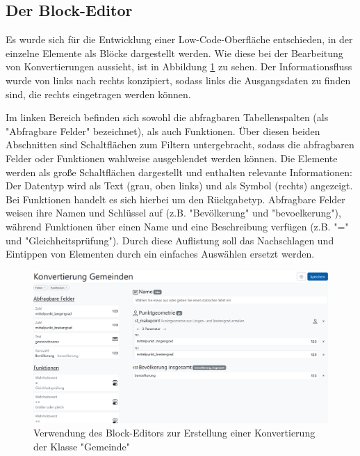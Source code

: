 \subsection{Der Block-Editor}

Es wurde sich für die Entwicklung einer Low-Code-Oberfläche entschieden, in der einzelne Elemente als Blöcke dargestellt werden. Wie diese bei der Bearbeitung von Konvertierungen aussieht, ist in Abbildung \ref{fig:buffet-simple} zu sehen. Der Informationsfluss wurde von links nach rechts konzipiert, sodass links die Ausgangsdaten zu finden sind, die rechts eingetragen werden können.

Im linken Bereich befinden sich sowohl die abfragbaren Tabellenspalten (als "Abfragbare Felder" bezeichnet), als auch Funktionen. Über diesen beiden Abschnitten sind Schaltflächen zum Filtern untergebracht, sodass die abfragbaren Felder oder Funktionen wahlweise ausgeblendet werden können. Die Elemente werden als große Schaltflächen dargestellt und enthalten relevante Informationen: Der Datentyp wird als Text (grau, oben links) und als Symbol (rechts) angezeigt. Bei Funktionen handelt es sich hierbei um den Rückgabetyp. Abfragbare Felder weisen ihre Namen und Schlüssel auf (z.B. "Bevölkerung" und "bevoelkerung"), während Funktionen über einen Name und eine Beschreibung verfügen (z.B. "=" und "Gleichheitsprüfung"). Durch diese Auflistung soll das Nachschlagen und Eintippen von Elementen durch ein einfaches Auswählen ersetzt werden.

\begin{figure}[ht]
  \centering
  \includegraphics[width=.95\textwidth]{assets/buffet-simple.png}
  \caption{Verwendung des Block-Editors zur Erstellung einer Konvertierung der Klasse "Gemeinde"}
  \label{fig:buffet-simple}
\end{figure}


